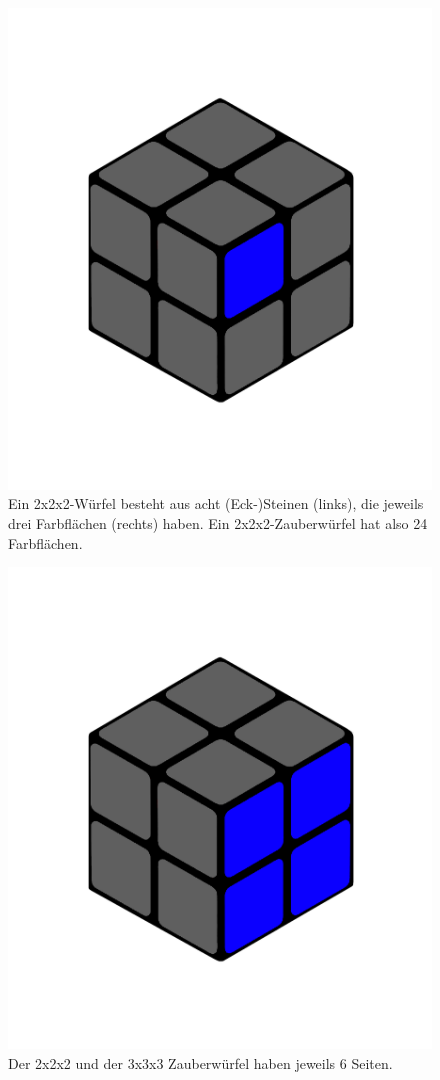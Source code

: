 \documentclass[12pt,a4paper, usenames, dvipsnames]{article}
\begin{document}
\begin{figure}[h]
\includegraphics[scale=0.1]{2x2farbflaeche.png}
\caption[Eckstein und Farbfläche des Würfels]{Ein 2x2x2-Würfel besteht aus acht (Eck-)Steinen (links), die jeweils drei Farbflächen (rechts) haben. Ein 2x2x2-Zauberwürfel hat also 24 Farbflächen.}
\end{figure} 


\begin{figure}[H]
\centering
\includegraphics[scale=0.1]{2x2seite.png}
\caption[Seite des Würfels]{Der 2x2x2 und der 3x3x3 Zauberwürfel haben jeweils 6 Seiten.}
\end{figure}
\end{document}
